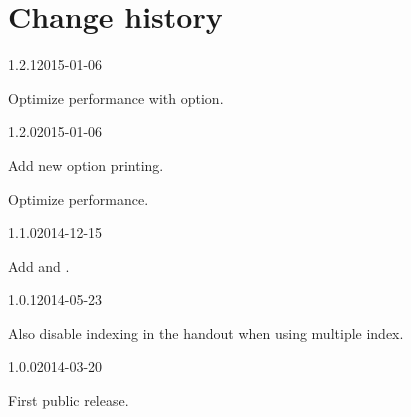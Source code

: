 \documentclass{ltxdockit}[2011/03/25]
\begin{document}
\section{Change history}

\begin{changelog}

\begin{release}{1.2.1}{2015-01-06}
\item Optimize performance with  option.
\end{release}

\begin{release}{1.2.0}{2015-01-06}
\item Add new option printing. 
\item Optimize performance.
\end{release}

\begin{release}{1.1.0}{2014-12-15}
\item Add  and . 
\end{release}

\begin{release}{1.0.1}{2014-05-23}
\item Also disable indexing in the handout when using multiple index.
\end{release}

\begin{release}{1.0.0}{2014-03-20}
\item First public release.
\end{release}
\end{changelog}
\end{document}
